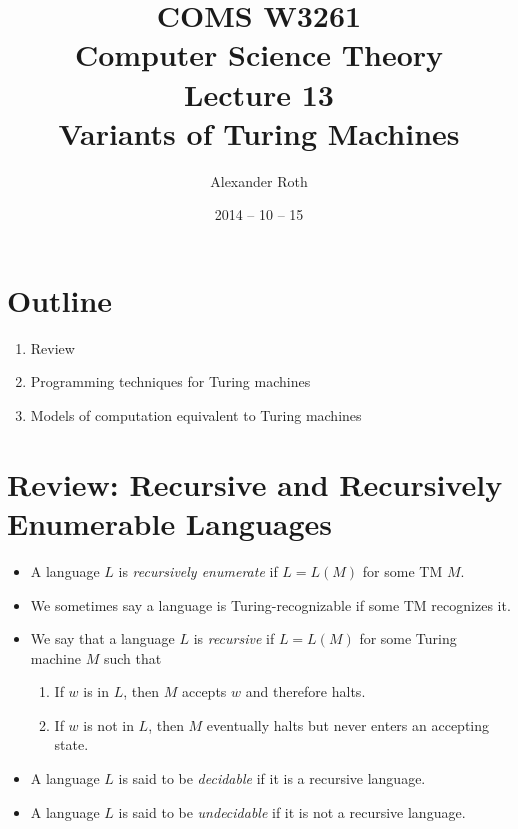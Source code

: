 \documentclass[]{article}
\begin{document}
\newcommand*{\xml}[1]{\texttt{<#1>}}
\theoremstyle{definition}
\newtheorem{thm}{Theorem}

\title{COMS W3261 \\ Computer Science Theory \\ Lecture 13\\ Variants of Turing Machines}
\author{Alexander Roth}
\date{2014 -- 10 -- 15}
\maketitle
\section*{Outline}
  \begin{enumerate}
    \item Review
    \item Programming techniques for Turing machines
    \item Models of computation equivalent to Turing machines
  \end{enumerate}
  
\section{Review: Recursive and Recursively Enumerable Languages}
  \begin{itemize}
    \item A language $L$ is \emph{recursively enumerate} if $L = L(M)$ for some TM 
    $M$.
    \item We sometimes say a language is Turing-recognizable if some TM recognizes 
    it.
    \item We say that a language $L$ is \emph{recursive} if $L = L(M)$ for some 
    Turing machine $M$ such that
      \begin{enumerate}
        \item If $w$ is in $L$, then $M$ accepts $w$ and therefore halts.
        \item If $w$ is not in $L$, then $M$ eventually halts but never enters 
        an accepting state.
      \end{enumerate}
    \item A language $L$ is said to be \emph{decidable} if it is a recursive 
    language.
    \item A language $L$ is said to be \emph{undecidable} if it is not a 
    recursive language.
  \end{itemize}
\end{document}
